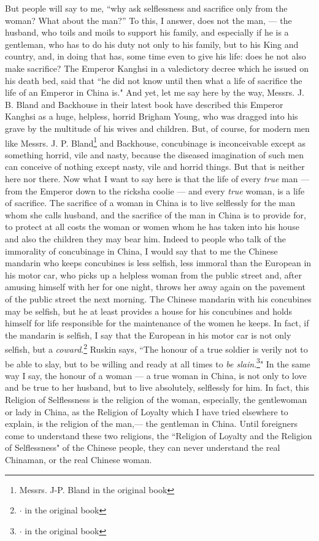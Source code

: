 But people will say to me, ``why ask selflessness and sacrifice only from the woman? What about the man?'' 
To this, I answer, does not the man, --- the husband, who toils and moils to support his family, and especially if he is a gentleman, who has to do his duty not only to his family, but to his King and country, and, in doing that has, some time even to give his life: does he not also make sacrifice?
The Emperor Kanghsi in a valedictory decree which he issued on his death bed, said that ``he did not know until then what a life of sacrifice the life of an Emperor in China is." 
And yet, let me say here by the way, Messrs. J. B. Bland and Backhouse in their latest book have described this Emperor Kanghsi as a huge, helpless, horrid Brigham Young, who was dragged into his grave by the multitude of his wives and children.
But, of course, for modern men like Messrs. J. P. Bland\footnote{Messrs. J-P. Bland in the original book} and Backhouse, concubinage is  inconceivable except as something horrid, vile and nasty, because the diseased imagination of such men can conceive of nothing except nasty, vile and horrid things.
But that is neither here nor there.
Now what I want to say here is that  the life of every \emph{true} man --- from the Emperor down to the ricksha coolie --- and every \emph{true} woman, is a life of sacrifice.
The sacrifice of a woman in China is to live selflessly for the man whom she calls husband, and the sacrifice of the man in China is to provide for, to protect at all costs the woman or women whom he has taken into his house and also the children they may bear him.
Indeed to people who talk of the immorality of concubinage in China, I would say that to me the Chinese mandarin who keeps concubines is less selfish, less immoral than the European in his motor car, who picks up a helpless woman from the public street and, after amusing himself with her for one night, throws her away again on the pavement of the public street the next morning.
The Chinese mandarin with his concubines may be selfish, but he at least provides a house for his concubines and holds himself for life responsible for the maintenance of the women he keeps.
In fact, if the mandarin is selfish, I say that the European in his motor car is not only selfish, but a \emph{coward}.\footnote{{\huge$\cdot$} in the original book}
Ruskin says, ``The honour of a true soldier is verily not to be able to slay, but to be willing and ready at all times to \emph{be slain}.\footnote{{\huge$\cdot$} in the original book}"
In the same way I say, the honour of a woman --- a true woman in China, is not only to love and be true to her husband, but to live absolutely, selflessly for him.
In fact, this Religion of Selflessness is the religion of the woman, especially, the gentlewoman or lady in China, as the Religion of Loyalty which I have tried elsewhere to explain, is the religion of the man,--- the gentleman in China.
Until foreigners come to understand these two religions, the ``Religion of Loyalty and the Religion of Selflessness" of the Chinese people, they can never understand the real Chinaman, or the real Chinese woman.

